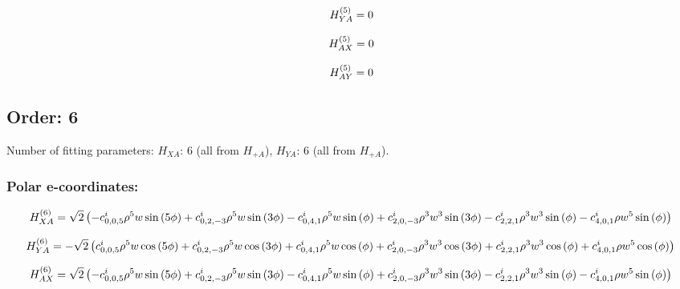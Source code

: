 \documentclass[fleqn]{article}
\begin{document}
\begin{dmath*}
H_{YA}^{(5)}=0\\
\end{dmath*}

\begin{dmath*}
H_{AX}^{(5)}=0\\
\end{dmath*}

\begin{dmath*}
H_{AY}^{(5)}=0\\
\end{dmath*}
\subsection{Order: 6}
Number of fitting parameters: $H_{XA}$: $6$ (all from $H_{+A}$), $H_{YA}$: $6$ (all from $H_{+A}$).
\subsubsection*{Polar e-coordinates:}

\begin{dmath*}
H_{XA}^{(6)}=\sqrt{2} \left(- c^{i}_{0,0,5} \rho^{5} w \sin{\left (5 \phi \right )} + c^{i}_{0,2,-3} \rho^{5} w \sin{\left (3 \phi \right )} - c^{i}_{0,4,1} \rho^{5} w \sin{\left (\phi \right )} + c^{i}_{2,0,-3} \rho^{3} w^{3} \sin{\left (3 \phi \right )} - c^{i}_{2,2,1} \rho^{3} w^{3} \sin{\left (\phi \right )} - c^{i}_{4,0,1} \rho w^{5} \sin{\left (\phi \right )}\right)\\
\end{dmath*}

\begin{dmath*}
H_{YA}^{(6)}=-  \sqrt{2} \left( c^{i}_{0,0,5} \rho^{5} w \cos{\left (5 \phi \right )} +  c^{i}_{0,2,-3} \rho^{5} w \cos{\left (3 \phi \right )} +  c^{i}_{0,4,1} \rho^{5} w \cos{\left (\phi \right )} +  c^{i}_{2,0,-3} \rho^{3} w^{3} \cos{\left (3 \phi \right )} +  c^{i}_{2,2,1} \rho^{3} w^{3} \cos{\left (\phi \right )} +  c^{i}_{4,0,1} \rho w^{5} \cos{\left (\phi \right )}\right)\\
\end{dmath*}

\begin{dmath*}
H_{AX}^{(6)}=\sqrt{2} \left(- c^{i}_{0,0,5} \rho^{5} w \sin{\left (5 \phi \right )} + c^{i}_{0,2,-3} \rho^{5} w \sin{\left (3 \phi \right )} - c^{i}_{0,4,1} \rho^{5} w \sin{\left (\phi \right )} + c^{i}_{2,0,-3} \rho^{3} w^{3} \sin{\left (3 \phi \right )} - c^{i}_{2,2,1} \rho^{3} w^{3} \sin{\left (\phi \right )} - c^{i}_{4,0,1} \rho w^{5} \sin{\left (\phi \right )}\right)\\
\end{dmath*}
\end{document}
